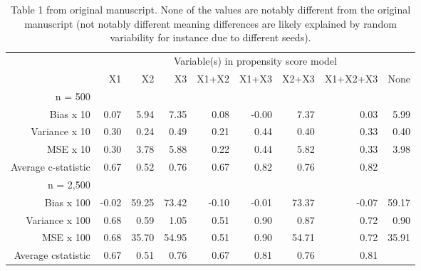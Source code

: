 \documentclass[10,a4paperpaper,]{article}
\begin{document}
\begin{table}[ht]
\centering
\begin{tabular}{rrrrrrrrr}
  \hline
  & \multicolumn{8}{c}{Variable(s) in propensity score model} \\
 & X1 & X2 & X3 & X1+X2 & X1+X3 & X2+X3 & X1+X2+X3 & None \\
 \hline
n = 500 &  &  &  &  &  &  &  &  \\ 
  Bias x 10 & 0.07 & 5.94 & 7.35 & 0.08 & -0.00 & 7.37 & 0.03 & 5.99 \\ 
  Variance x 10 & 0.30 & 0.24 & 0.49 & 0.21 & 0.44 & 0.40 & 0.33 & 0.40 \\ 
  MSE x 10 & 0.30 & 3.78 & 5.88 & 0.22 & 0.44 & 5.82 & 0.33 & 3.98 \\ 
  Average c-statistic & 0.67 & 0.52 & 0.76 & 0.67 & 0.82 & 0.76 & 0.82 &  \\ 
  n = 2,500 &  &  &  &  &  &  &  &  \\ 
  Bias x 100 & -0.02 & 59.25 & 73.42 & -0.10 & -0.01 & 73.37 & -0.07 & 59.17 \\ 
  Variance x 100 & 0.68 & 0.59 & 1.05 & 0.51 & 0.90 & 0.87 & 0.72 & 0.90 \\ 
  MSE x 100 & 0.68 & 35.70 & 54.95 & 0.51 & 0.90 & 54.71 & 0.72 & 35.91 \\ 
  Average cstatistic & 0.67 & 0.51 & 0.76 & 0.67 & 0.81 & 0.76 & 0.81 &  \\ 
   \hline
\end{tabular}
\caption{Table 1 from original manuscript. None of the values are notably different from the original manuscript (not notably different meaning differences are likely explained by random variability for instance due to different seeds).}
\end{table}
\end{document}
